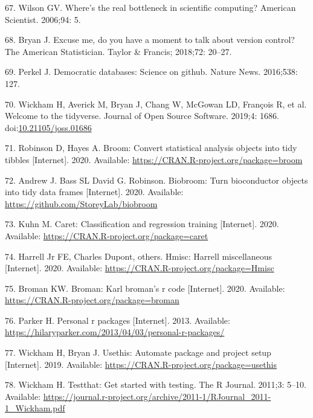 \documentclass[10pt,letterpaper]{article}
\begin{document}
\leavevmode\hypertarget{ref-wilson2006}{}%
67. Wilson GV. Where's the real bottleneck in scientific computing?
American Scientist. 2006;94: 5.

\leavevmode\hypertarget{ref-bryan2018}{}%
68. Bryan J. Excuse me, do you have a moment to talk about version
control? The American Statistician. Taylor \& Francis; 2018;72: 20--27.

\leavevmode\hypertarget{ref-perkel2016}{}%
69. Perkel J. Democratic databases: Science on github. Nature News.
2016;538: 127.

\leavevmode\hypertarget{ref-tidyverse}{}%
70. Wickham H, Averick M, Bryan J, Chang W, McGowan LD, François R, et
al. Welcome to the tidyverse. Journal of Open Source Software. 2019;4:
1686.
doi:\href{https://doi.org/10.21105/joss.01686}{10.21105/joss.01686}

\leavevmode\hypertarget{ref-broom}{}%
71. Robinson D, Hayes A. Broom: Convert statistical analysis objects
into tidy tibbles {[}Internet{]}. 2020. Available:
\url{https://CRAN.R-project.org/package=broom}

\leavevmode\hypertarget{ref-biobroom}{}%
72. Andrew J. Bass SL David G. Robinson. Biobroom: Turn bioconductor
objects into tidy data frames {[}Internet{]}. 2020. Available:
\url{https://github.com/StoreyLab/biobroom}

\leavevmode\hypertarget{ref-caret}{}%
73. Kuhn M. Caret: Classification and regression training
{[}Internet{]}. 2020. Available:
\url{https://CRAN.R-project.org/package=caret}

\leavevmode\hypertarget{ref-Hmisc}{}%
74. Harrell Jr FE, Charles Dupont, others. Hmisc: Harrell miscellaneous
{[}Internet{]}. 2020. Available:
\url{https://CRAN.R-project.org/package=Hmisc}

\leavevmode\hypertarget{ref-broman}{}%
75. Broman KW. Broman: Karl broman's r code {[}Internet{]}. 2020.
Available: \url{https://CRAN.R-project.org/package=broman}

\leavevmode\hypertarget{ref-parker2013}{}%
76. Parker H. Personal r packages {[}Internet{]}. 2013. Available:
\url{https://hilaryparker.com/2013/04/03/personal-r-packages/}

\leavevmode\hypertarget{ref-usethis}{}%
77. Wickham H, Bryan J. Usethis: Automate package and project setup
{[}Internet{]}. 2019. Available:
\url{https://CRAN.R-project.org/package=usethis}

\leavevmode\hypertarget{ref-testthat}{}%
78. Wickham H. Testthat: Get started with testing. The R Journal.
2011;3: 5--10. Available:
\url{https://journal.r-project.org/archive/2011-1/RJournal_2011-1_Wickham.pdf}
\end{document}
